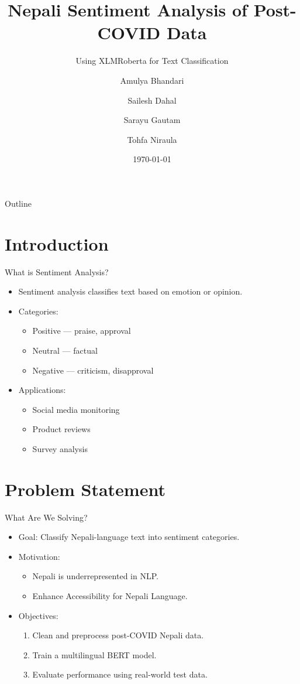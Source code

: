 \documentclass[aspectratio=169]{beamer}
\title{Nepali Sentiment Analysis of Post-COVID Data}
\subtitle{Using XLMRoberta for Text Classification}
\author{Amulya Bhandari \and Sailesh Dahal \and Sarayu Gautam \and Tohfa Niraula}
\institute{Department of Computer Engineering\\Kathmandu University}
\date{\today}
\begin{document}
\maketitle

\begin{frame}{Outline}
  \tableofcontents
\end{frame}

\section{Introduction}
\begin{frame}{What is Sentiment Analysis?}
  \begin{itemize}
    \item Sentiment analysis classifies text based on emotion or opinion.
    \item Categories:
          \begin{itemize}
            \item Positive — praise, approval
            \item Neutral — factual
            \item Negative — criticism, disapproval
          \end{itemize}
    \item Applications:
          \begin{itemize}
            \item Social media monitoring
            \item Product reviews
            \item Survey analysis
          \end{itemize}
  \end{itemize}
\end{frame}

\section{Problem Statement}
\begin{frame}{What Are We Solving?}
  \begin{itemize}
    \item Goal: Classify Nepali-language text into sentiment categories.
    \item Motivation:
          \begin{itemize}
            \item Nepali is underrepresented in NLP.
            \item Enhance Accessibility for Nepali Language.
          \end{itemize}
    \item Objectives:
          \begin{enumerate}
            \item Clean and preprocess post-COVID Nepali data.
            \item Train a multilingual BERT model.
            \item Evaluate performance using real-world test data.
          \end{enumerate}
  \end{itemize}
\end{frame}
\end{document}
